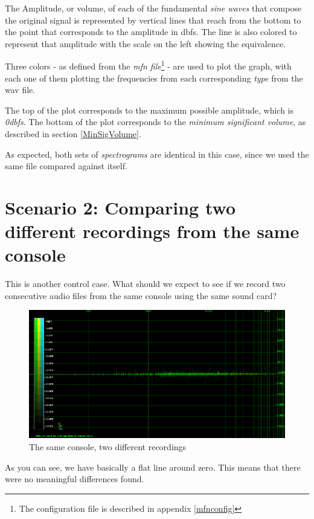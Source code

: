 \documentclass[10pt,a4paper]{report}
\newcommand{\db}[1]{\textit{#1\acrshort{dbfs}}}
\begin{document}
The Amplitude, or volume, of each of the fundamental \textit{sine waves} that compose the original signal is represented by vertical lines that reach from the bottom to the point that corresponds to the amplitude in \acrshort{dbfs}. The line is also colored to represent that amplitude with the scale on the left showing the equivalence.

Three colors - as defined from the \textit{mfn file}\footnote{The configuration file is described in appendix \ref{mfnconfig}} - are used to plot the graph, with each one of them plotting the frequencies from each corresponding \textit{type} from the \acrshort{wav} file.

The top of the plot corresponds to the maximum possible amplitude, which is \db{0}. The bottom of the plot corresponds to the \textit{minimum significant volume}, as described in section \ref{MinSigVolume}.

As expected, both sets of \textit{spectrograms} are identical in this case, since we used the same file compared against itself.

\section{Scenario 2: Comparing two different recordings from the same console}

This is another control case. What should we expect to see if we record two consecutive audio files from the same console using the same sound card?

\begin{figure}[H]
	\centering
	\includegraphics[width=1\linewidth]{images/interpretation/Plot2-Sameconsole.png}
	\caption[Same console compared]{The same console, two different recordings}
	\label{fig:plot2-sameconsole}
\end{figure}

As you can see, we have basically a flat line around zero. This means that there were no meaningful differences found. 
\end{document}
